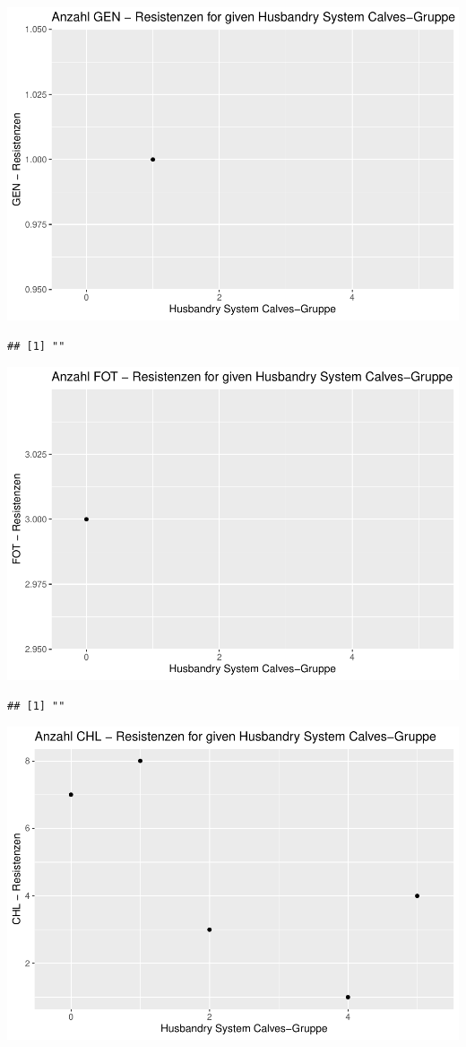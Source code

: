 \documentclass[
]{article}
\begin{document}
\includegraphics{NResistenzen_files/figure-latex/binary_or_nominal_variables-34.pdf}

\begin{verbatim}
## [1] ""
\end{verbatim}

\includegraphics{NResistenzen_files/figure-latex/binary_or_nominal_variables-35.pdf}

\begin{verbatim}
## [1] ""
\end{verbatim}

\includegraphics{NResistenzen_files/figure-latex/binary_or_nominal_variables-36.pdf}
\end{document}
